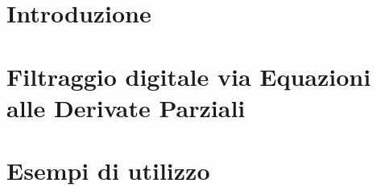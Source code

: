 \documentclass[%
	corpo=11pt,
    twoside,
    stile=classica,
    oldstyle,
    tipotesi=custom,
    greek,
    evenboxes,
]{toptesi}
\theoremstyle{plain}
\begin{document}

\figurespagetrue%

\indici%



\mainmatter

\newpage
\chapter{Introduzione}



\newpage
\chapter{Filtraggio digitale via Equazioni alle Derivate Parziali}


\chapter{Esempi di utilizzo}





\end{document}
